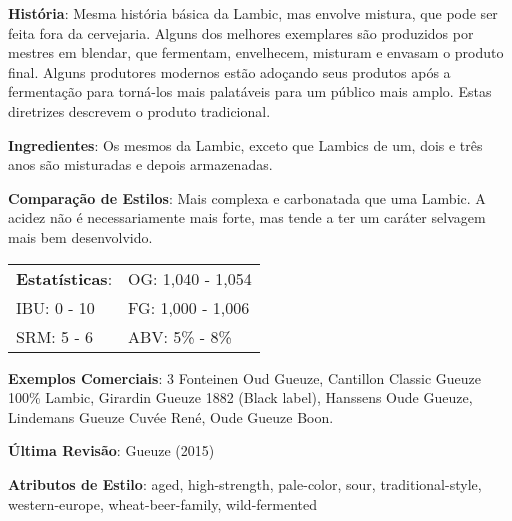\textbf{História}: Mesma história básica da Lambic, mas envolve mistura, que pode ser feita fora da cervejaria. Alguns dos melhores exemplares são produzidos por mestres em blendar, que fermentam, envelhecem, misturam e envasam o produto final. Alguns produtores modernos estão adoçando seus produtos após a fermentação para torná-los mais palatáveis para um público mais amplo. Estas diretrizes descrevem o produto tradicional.

\textbf{Ingredientes}: Os mesmos da Lambic, exceto que Lambics de um, dois e três anos são misturadas e depois armazenadas.

\textbf{Comparação de Estilos}: Mais complexa e carbonatada que uma Lambic. A acidez não é necessariamente mais forte, mas tende a ter um caráter selvagem mais bem desenvolvido.

\begin{tabular}{@{}p{35mm}p{35mm}@{}}
  \textbf{Estatísticas}: & OG: 1,040 - 1,054 \\
  IBU: 0 - 10  & FG: 1,000 - 1,006  \\
  SRM: 5 - 6  & ABV: 5\% - 8\%
\end{tabular}

\textbf{Exemplos Comerciais}: 3 Fonteinen Oud Gueuze, Cantillon Classic Gueuze 100\% Lambic, Girardin Gueuze 1882 (Black label), Hanssens Oude Gueuze, Lindemans Gueuze Cuvée René, Oude Gueuze Boon.

\textbf{Última Revisão}: Gueuze (2015)

\textbf{Atributos de Estilo}: aged, high-strength, pale-color, sour, traditional-style, western-europe, wheat-beer-family, wild-fermented

